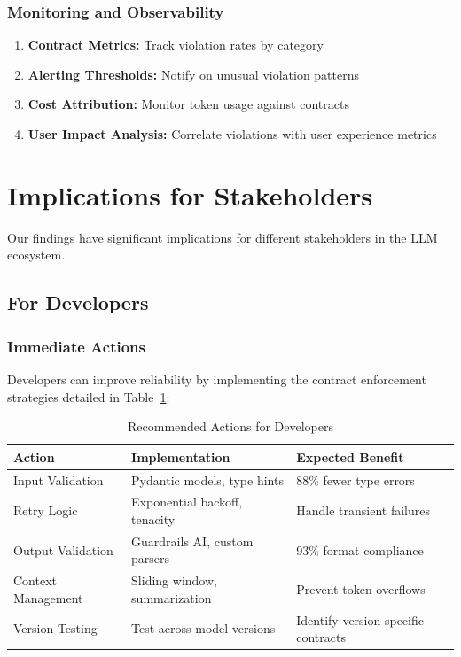 \documentclass[11pt]{article}
\begin{document}
\subsubsection{Monitoring and Observability}
\begin{enumerate}
    \item \textbf{Contract Metrics:} Track violation rates by category
    \item \textbf{Alerting Thresholds:} Notify on unusual violation patterns
    \item \textbf{Cost Attribution:} Monitor token usage against contracts
    \item \textbf{User Impact Analysis:} Correlate violations with user experience metrics
\end{enumerate}

\section{Implications for Stakeholders}
\label{sec:implications}

Our findings have significant implications for different stakeholders in the LLM ecosystem.

\subsection{For Developers}

\subsubsection{Immediate Actions}
Developers can improve reliability by implementing the contract enforcement strategies detailed in Table~\ref{tab:developer_actions}:

\begin{table}[h]
\centering
\caption{Recommended Actions for Developers}
\label{tab:developer_actions}
\begin{tabular}{p{3.5cm}p{5cm}p{4.5cm}}
\toprule
\textbf{Action} & \textbf{Implementation} & \textbf{Expected Benefit} \\
\midrule
Input Validation & Pydantic models, type hints & 88\% fewer type errors \\
Retry Logic & Exponential backoff, tenacity & Handle transient failures \\
Output Validation & Guardrails AI, custom parsers & 93\% format compliance \\
Context Management & Sliding window, summarization & Prevent token overflows \\
Version Testing & Test across model versions & Identify version-specific contracts \\
\bottomrule
\end{tabular}
\end{table}
\end{document}

